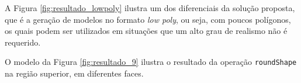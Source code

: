 \newpage

A Figura \ref{fig:resultado_lowpoly} ilustra um dos diferenciais da solução proposta, que é a geração de modelos no formato \textit{low poly}, ou seja, com poucos polígonos, os quais podem ser utilizados em situações que um alto grau de realismo não é requerido.

\begin{figure}[h!]
	\centering
	\captionsetup{width=15cm}
	{}	
\end{figure}

O modelo da Figura \ref{fig:resultado_9} ilustra o resultado da operação \texttt{roundShape} na região superior, em diferentes faces.

\begin{figure}[h!]
	\centering
	\captionsetup{width=15cm}
	{}	
\end{figure}


